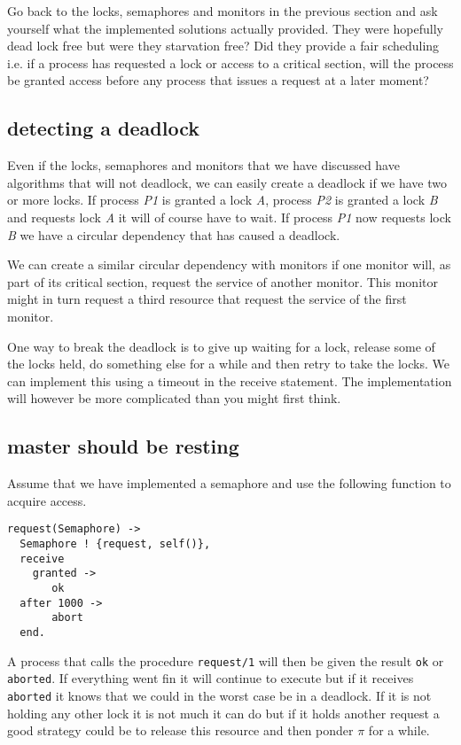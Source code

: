 \documentclass[a4paper,11pt]{article}
\begin{document}
Go back to the locks, semaphores and monitors in the previous section
and ask yourself what the implemented solutions actually provided. They
were hopefully dead lock free but were they starvation free? Did they
provide a fair scheduling i.e. if a process has requested a lock or
access to a critical section, will the process be granted access
before any process that issues a request at a later moment?


\subsection{detecting a deadlock}

Even if the locks, semaphores and monitors that we have discussed have
algorithms that will not deadlock, we can easily create a deadlock if
we have two or more locks. If process {\em P1} is granted a lock {\em
  A}, process {\em P2} is granted a lock {\em B} and requests lock
{\em A} it will of course have to wait. If process {\em P1} now
requests lock {\em B} we have a circular dependency that has caused a
deadlock.

We can create a similar circular dependency with monitors if one
monitor will, as part of its critical section, request the service of
another monitor. This monitor might in turn request a third resource
that request the service of the first monitor.

One way to break the deadlock is to give up waiting for a lock,
release some of the locks held, do something else for a while and then
retry to take the locks. We can implement this using a timeout in the
receive statement. The implementation will however be more complicated
than you might first think.

\subsection{master should be resting}

Assume that we have implemented a semaphore and use the following
function to acquire access.

\begin{verbatim}
request(Semaphore) ->
  Semaphore ! {request, self()},
  receive 
    granted ->
       ok
  after 1000 ->
       abort
  end.    
\end{verbatim}

A process that calls the procedure {\tt request/1} will then be given
the result {\tt ok} or {\tt aborted}. If everything went fin it will
continue to execute but if it receives {\tt aborted} it knows that we
could in the worst case be in a deadlock. If it is not holding any
other lock it is not much it can do but if it holds another request a
good strategy could be to release this resource and then ponder $\pi$
for a while.
\end{document}
